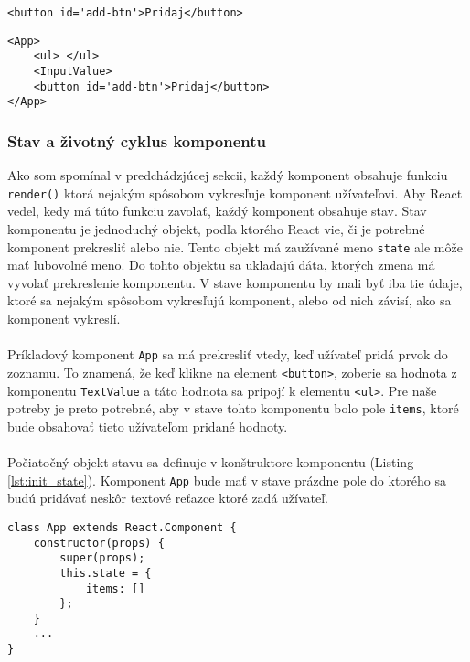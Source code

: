 \begin{lstlisting}[caption={Vytvorenie elementu pomocou JSX}, label={lst:jsx_element_creation}]
<button id='add-btn'>Pridaj</button>
\end{lstlisting}

\begin{lstlisting}[caption={Vytvorenie komponentu pomocou JSX}, label={lst:jsx_component_creation}]
<App>
	<ul> </ul>
	<InputValue>
	<button id='add-btn'>Pridaj</button>
</App>
\end{lstlisting}




\subsubsection{Stav a  životný cyklus komponentu}
Ako som spomínal v predchádzjúcej sekcii, každý komponent obsahuje funkciu \texttt{render()} ktorá nejakým spôsobom vykresľuje komponent užívateľovi. Aby React vedel, kedy má túto funkciu zavolať, každý komponent obsahuje stav. Stav komponentu je jednoduchý objekt, podľa ktorého React vie, či je potrebné komponent prekresliť alebo nie. Tento objekt má zaužívané meno \texttt{state} ale môže mať ľubovolné meno. Do tohto objektu sa ukladajú dáta, ktorých zmena má vyvolať prekreslenie komponentu. V stave komponentu by mali byť iba tie údaje, ktoré sa nejakým spôsobom vykresľujú komponent, alebo od nich závisí, ako sa komponent vykreslí.
\paragraph{}
Príkladový komponent \texttt{App} sa má prekresliť vtedy, keď užívateľ pridá prvok do zoznamu. To znamená, že keď klikne na element \texttt{<button>}, zoberie sa hodnota z komponentu \texttt{TextValue} a táto hodnota sa pripojí k elementu \texttt{<ul>}. Pre naše potreby je preto potrebné, aby v stave tohto komponentu bolo pole \texttt{items}, ktoré bude obsahovať tieto užívateľom pridané hodnoty.
\paragraph{}
Počiatočný objekt stavu sa definuje v konštruktore komponentu (Listing \ref{lst:init_state}). Komponent \texttt{App} bude mať v stave prázdne pole do ktorého sa budú pridávať neskôr textové reťazce ktoré zadá užívateľ.
\begin{lstlisting}[caption={Definovanie stavu v konštruktore komponentu},label={lst:init_state}]
class App extends React.Component {
	constructor(props) {
		super(props);
		this.state = {
			items: []
		};
	}
	...
}
\end{lstlisting}
